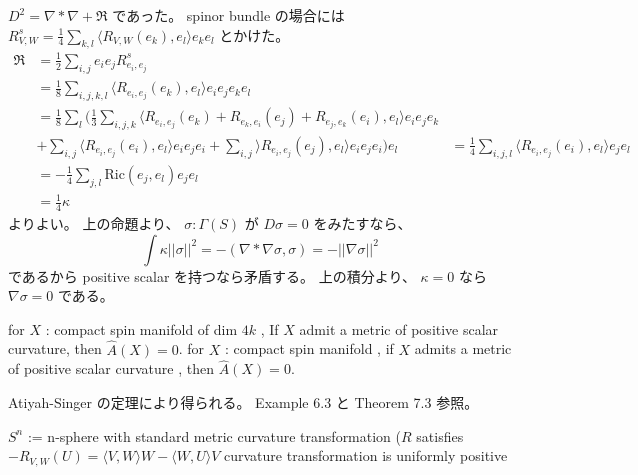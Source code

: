 \begin{Proof}
\itemprof
  \(D^2 = \nabla*\nabla + \mathfrak{R} \) であった。
  spinor bundle の場合には \(R^s_{V,W} = \frac{1}{4}\sum_{k,l}\langle R_{V,W}(e_k),e_l\rangle e_k e_l\) とかけた。
  \begin{align*}
    \mathfrak{R}
    &= \frac{1}{2} \sum_{i,j} e_i e_j R^s_{e_i,e_j} \\
    &= \frac{1}{8} \sum_{i,j,k,l} \langle R_{e_i,e_j}(e_k),e_l \rangle e_i e_j e_k e_l \\
    &= \frac{1}{8} \sum_l (
    \frac{1}{3} \sum_{i,j,k}
    \langle R_{e_i,e_j} (e_k) + R_{e_k,e_i} (e_j) + R_{e_j,e_k} (e_i) , e_l \rangle e_i e_j e_k \\
    & + \sum_{i,j} \langle R_{e_i,e_j}(e_i),e_l \rangle e_i e_j e_i
    + \sum_{i,j} \rangle R_{e_i,e_j}(e_j),e_l \rangle e_i e_j e_i
    ) e_l
    &= \frac{1}{4} \sum_{i,j,l} \langle R_{e_i,e_j}(e_i),e_l\rangle e_j e_l \\
    &= - \frac{1}{4} \sum_{j,l}\text{Ric}(e_j,e_l) e_j e_l \\
    &= \frac{1}{4} \kappa
  \end{align*}
  よりよい。
\itemprof
  上の命題より、 \(\sigma : \Gamma(S)\) が \(D \sigma = 0\) をみたすなら、
  \[\int \kappa ||\sigma||^2 = - (\nabla*\nabla \sigma , \sigma) = - ||\nabla\sigma||^2\]
  であるから positive scalar を持つなら矛盾する。
\itemprof
  上の積分より、 \(\kappa = 0\) なら \(\nabla \sigma = 0\) である。
\end{Proof}

\begin{Theorem}
\itemprop
  for \(X\) : compact spin manifold of dim \(4k\) , If \(X\) admit a metric of positive scalar curvature, then \(\hat{A}(X) = 0\).
\itemprop
  for \(X\) : compact spin manifold , if \(X\) admits a metric of positive scalar curvature , then \(\hat{A}(X) = 0\).
\end{Theorem}

\begin{Proof}
\itemprof
  Atiyah-Singer の定理により得られる。
  Example 6.3 と Theorem 7.3 参照。
\end{Proof}

\begin{Theorem}
\itemwhen
  \Let \(S^n\) := n-sphere with standard metric
\itemprop
  \Then curvature transformation (\(R\) satisfies \(- R_{V,W}(U) = \langle V , W \rangle W - \langle W , U \rangle V\)
\itemprop
  \Then curvature transformation is uniformly positive
\end{Theorem}

